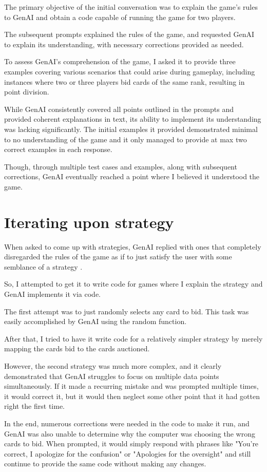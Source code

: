 \documentclass[10pt,onecolumn,letterpaper]{article}
\begin{document}
The primary objective of the initial conversation was to explain the game's rules to GenAI and obtain a code capable of running the game for two players.

The subsequent prompts explained the rules of the game, and requested GenAI to explain its understanding, with necessary corrections provided as needed.

To assess GenAI's comprehension of the game, I asked it to provide three examples covering various scenarios that could arise during gameplay, including instances where two or three players bid cards of the same rank, resulting in point division.

While GenAI consistently covered all points outlined in the prompts and provided coherent explanations in text, its ability to implement its understanding was lacking significantly. The initial examples it provided demonstrated minimal to no understanding of the game and it only managed to provide at max two correct examples in each response.

Though, through multiple test cases and examples, along with subsequent corrections, GenAI eventually reached a point where I believed it understood the game.

\section{Iterating upon strategy}
When asked to come up with strategies, GenAI replied with ones that completely disregarded the rules of the game as if to just satisfy the user with some semblance of a strategy .

So, I attempted to get it to write code for games where I explain the strategy and GenAI implements it via code.

The first attempt was to just randomly selects any card to bid. This task was easily accomplished by GenAI using the random function.

After that, I tried to have it write code for a relatively simpler strategy by merely mapping the cards bid to the cards auctioned.

However, the second strategy was much more complex, and it clearly demonstrated that GenAI struggles to focus on multiple data points simultaneously. If it made a recurring mistake and was prompted multiple times, it would correct it, but it would then neglect some other point that it had gotten right the first time.

In the end, numerous corrections were needed in the code to make it run, and GenAI was also unable to determine why the computer was choosing the wrong cards to bid. When prompted, it would simply respond with phrases like "You're correct, I apologize for the confusion" or "Apologies for the oversight" and still continue to provide the same code without making any changes.
\end{document}
